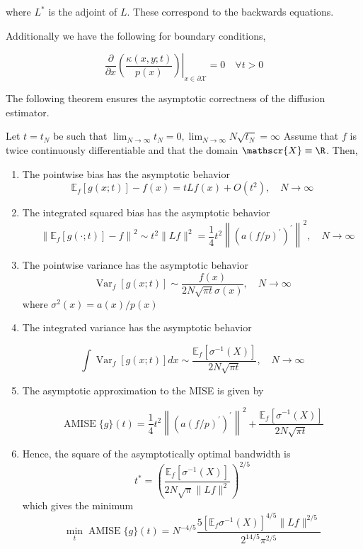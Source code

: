 where $L^*$ is the adjoint of $L$. These correspond to the backwards equations.

Additionally we have the following for boundary conditions,

$$
\left.\frac{\partial}{\partial x}\left(\frac{\kappa(x, y ; t)}{p(x)}\right)\right|_{x \in \partial \mathscr{X}}=0 \quad \forall t>0
$$

The following theorem ensures the asymptotic correctness of the diffusion estimator.

\begin{theorem}
Let $t=t_{N}$ be such that $\lim _{N \rightarrow \infty} t_{N}=0, \lim _{N \rightarrow \infty} N \sqrt{t_{N}}=\infty$
Assume that $f$ is twice continuously differentiable and that the domain $\mathscr{X} \equiv \R$. Then,
\begin{enumerate}
    \item The pointwise bias has the asymptotic behavior
    $$\mathbb{E}_{f}[g(x ; t)]-f(x)=t L f(x)+O\left(t^{2}\right), \quad N \rightarrow \infty$$
    
    \item The integrated squared bias has the asymptotic behavior
    $$\quad\left\|\mathbb{E}_{f}[g(\cdot ; t)]-f\right\|^{2} \sim t^{2}\|L f\|^{2}=\frac{1}{4} t^{2}\left\|\left(a(f / p)^{\prime}\right)^{\prime}\right\|^{2}, \quad N \rightarrow \infty$$
    
    \item The pointwise variance has the asymptotic behavior
    $$ \operatorname{Var}_{f}[g(x ; t)] \sim \frac{f(x)}{2 N \sqrt{\pi t} \sigma(x)}, \quad N \rightarrow \infty$$
    where $\sigma^{2}(x)=a(x) / p(x)$
    
    \item The integrated variance has the asymptotic behavior
    
    $$\int \operatorname{Var}_{f}[g(x ; t)] d x \sim \frac{\mathbb{E}_{f}\left[\sigma^{-1}(X)\right]}{2 N \sqrt{\pi t}}, \quad N \rightarrow \infty$$
    
    \item  The asymptotic approximation to the MISE is given by
    
    $$\operatorname{AMISE}\{g\}(t)=\frac{1}{4} t^{2}\left\|\left(a(f / p)^{\prime}\right)^{\prime}\right\|^{2}+\frac{\mathbb{E}_{f}\left[\sigma^{-1}(X)\right]}{2 N \sqrt{\pi t}}$$
    
    \item  Hence, the square of the asymptotically optimal bandwidth is
    $$t^{*}=\left(\frac{\mathbb{E}_{f}\left[\sigma^{-1}(X)\right]}{2 N \sqrt{\pi}\|L f\|^{2}}\right)^{2 / 5}$$
    which gives the minimum
    \[
    \min _{t} \operatorname{AMISE}\{g\}(t)=N^{-4 / 5} \frac{5\left[\mathbb{E}_{f} \sigma^{-1}(X)\right]^{4 / 5}\|L f\|^{2 / 5}}{2^{14 / 5} \pi^{2 / 5}}
    \]
\end{enumerate}
\end{theorem}

